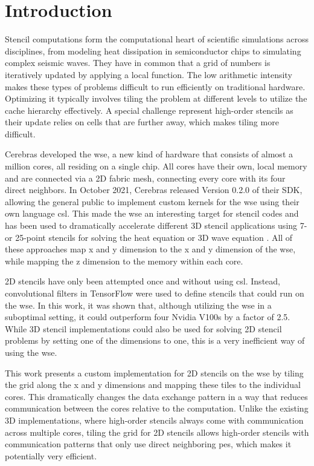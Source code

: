 \chapter{Introduction}
Stencil computations form the computational heart of scientific simulations across disciplines, from modeling heat dissipation in semiconductor chips to simulating complex seismic waves.
They have in common that a grid of numbers is iteratively updated by applying a local function.
The low arithmetic intensity makes these types of problems difficult to run efficiently on traditional hardware.
Optimizing it typically involves tiling the problem at different levels to utilize the cache hierarchy effectively.
A special challenge represent high-order stencils as their update relies on cells that are further away, which makes tiling more difficult.

Cerebras developed the \ac{wse}, a new kind of hardware that consists of almost a million cores, all residing on a single chip.
All cores have their own, local memory and are connected via a 2D fabric mesh, connecting every core with its four direct neighbors.
In October 2021, Cerebras released Version 0.2.0 of their SDK, allowing the general public to implement custom kernels for the \ac{wse} using their own language \ac{csl}. 
This made the \ac{wse} an interesting target for stencil codes and has been used to dramatically accelerate different 3D stencil applications using 7- or 25-point stencils for solving the heat equation or 3D wave equation \cite{jacquelin2022scalable,rocki2020fast,woo2022disruptive,sai2024matrix}.
All of these approaches map x and y dimension to the x and y dimension of the \ac{wse}, while mapping the z dimension to the memory within each core.

2D stencils have only been attempted once and without using \ac{csl}. Instead, convolutional filters in TensorFlow were used to define stencils that could run on the \ac{wse}\cite{brown2022tensorflow}. In this work, it was shown that, although utilizing the \ac{wse} in a suboptimal setting, it could outperform four Nvidia V100s by a factor of 2.5. While 3D stencil implementations could also be used for solving 2D stencil problems by setting one of the dimensions to one, this is a very inefficient way of using the \ac{wse}.

This work presents a custom implementation for 2D stencils on the \ac{wse} by tiling the grid along the x and y dimensions and mapping these tiles to the individual cores.
This dramatically changes the data exchange pattern in a way that reduces communication between the cores relative to the computation.
Unlike the existing 3D implementations, where high-order stencils always come with communication across multiple cores, tiling the grid for 2D stencils allows high-order stencils with communication patterns that only use direct neighboring \acp{pe}, which makes it potentially very efficient.

